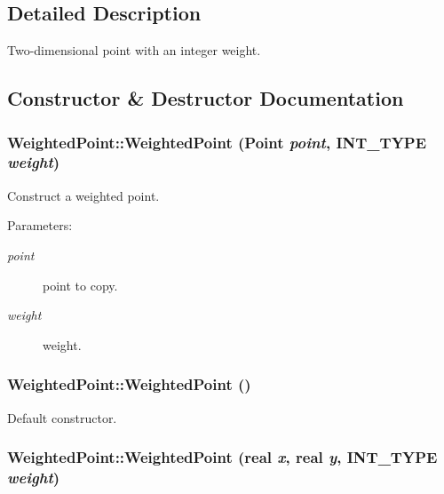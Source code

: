 \subsection{Detailed Description}
Two-dimensional point with an integer weight. 

\subsection{Constructor \& Destructor Documentation}
\hypertarget{class_weighted_point_1fc45412653300484ff917c0df7716c7}{
\subsubsection[{WeightedPoint}]{\setlength{\rightskip}{0pt plus 5cm}WeightedPoint::WeightedPoint ({\bf Point} {\em point}, \/  {\bf INT\_\-TYPE} {\em weight})}}
\label{class_weighted_point_1fc45412653300484ff917c0df7716c7}


Construct a weighted point. \begin{Desc}
\item[Parameters:]
\begin{description}
\item[{\em point}]point to copy. \item[{\em weight}]weight. \end{description}
\end{Desc}
\hypertarget{class_weighted_point_2a40faca74cd70475c325148056be842}{
\subsubsection[{WeightedPoint}]{\setlength{\rightskip}{0pt plus 5cm}WeightedPoint::WeightedPoint ()}}
\label{class_weighted_point_2a40faca74cd70475c325148056be842}


Default constructor. \hypertarget{class_weighted_point_7e3ace28b58144f273b7d178b6fb0a06}{
\subsubsection[{WeightedPoint}]{\setlength{\rightskip}{0pt plus 5cm}WeightedPoint::WeightedPoint ({\bf real} {\em x}, \/  {\bf real} {\em y}, \/  {\bf INT\_\-TYPE} {\em weight})}}
\label{class_weighted_point_7e3ace28b58144f273b7d178b6fb0a06}


